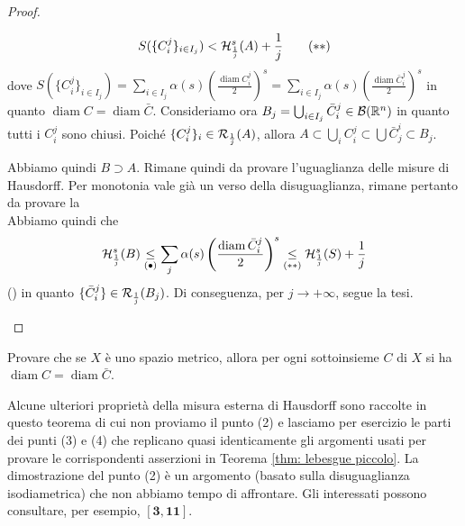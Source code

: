 \begin{proof}
\begin{enumerate}[label=\textbf{\Large\arabic*.}, ref=\textbf{\underline{(\arabic*)}}]
      \[S(\{C^j_i\}_{i\in I_j})<\mathcal{H}^s_\frac{1}{j}(A)+\frac{1}{j} \tag{$**$}\]
      dove $S(\{C^j_i\}_{i\in I_j}) = \sum_{i\in I_j}\alpha(s)\left(\frac{\operatorname{diam}C^j_i}{2}\right)^s=\sum_{i\in I_j}\alpha(s)\left(\frac{\operatorname{diam}\bar C^j_i}{2}\right)^s$  in quanto $\operatorname{diam}C = \operatorname{diam}\bar C$. Consideriamo ora $B_j=\bigcup_{i\in I_j}\bar C^j_i\in \mathcal{B}(\mathbb{R}^n)$ in quanto tutti i $C^j_i$ sono chiusi. Poiché $\{C_i^j\}_{i}\in \mathcal{R}_\frac{1}{j}(A)$, allora $A\subset \bigcup_i C_i^j\subset \bigcup \bar C_j^i \subset B_j$. 

      Abbiamo quindi $B\supset A$. Rimane quindi da provare l'uguaglianza delle misure di Hausdorff. Per monotonia vale già un verso della disuguaglianza, rimane pertanto da provare la \\
      Abbiamo quindi che 
      \[\mathcal{H}^s_{\frac{1}{j}}(B)\underset{(\bullet)}\leq\sum_j\alpha(s)\left( \frac{\operatorname{diam}\bar C_i^j}{2}\right)^s\underset{(**)}\leq \mathcal{H}^s_\frac{1}{j}(S)+\frac{1}{j}\]
      (\textbullet) in quanto $\{\bar C_i^j\}\in \mathcal{R}_\frac{1}{j}(B_j)$. Di conseguenza, per $j\to +\infty$, segue la tesi.\qedhere
  \end{enumerate}
\end{proof}

\begin{exc}Provare che se $X$ è uno spazio metrico, allora per ogni sottoinsieme $C$ di $X$ si ha $\operatorname{diam} C=\operatorname{diam} \bar{C}$. 
\end{exc}

Alcune ulteriori proprietà della misura esterna di Hausdorff sono raccolte in questo teorema di cui non proviamo il punto (2) e lasciamo per esercizio le parti dei punti (3) e (4) che replicano quasi identicamente gli argomenti usati per provare le corrispondenti asserzioni in Teorema \ref{thm: lebesgue piccolo}. La dimostrazione del punto (2) è un argomento (basato sulla disuguaglianza isodiametrica) che non abbiamo tempo di affrontare. Gli interessati possono consultare, per esempio, $[\mathbf{3}, \mathbf{11}]$.



